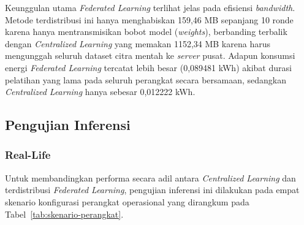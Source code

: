 \documentclass[conference]{IEEEtran}
\begin{document}
Keunggulan utama \textit{Federated Learning} terlihat jelas pada efisiensi \textit{bandwidth}. Metode terdistribusi ini hanya menghabiskan 159,46 MB sepanjang 10 ronde karena hanya mentransmisikan bobot model (\textit{weights}), berbanding terbalik dengan \textit{Centralized Learning} yang memakan 1152,34 MB karena harus mengunggah seluruh dataset citra mentah ke \textit{server} pusat. Adapun konsumsi energi \textit{Federated Learning} tercatat lebih besar (0,089481 kWh) akibat durasi pelatihan yang lama pada seluruh perangkat secara bersamaan, sedangkan \textit{Centralized Learning} hanya sebesar 0,012222 kWh.

\subsection{Pengujian Inferensi}

\subsubsection{Real-Life}
Untuk membandingkan performa secara adil antara \textit{Centralized Learning} dan terdistribusi \textit{Federated Learning}, pengujian inferensi ini dilakukan pada empat skenario konfigurasi perangkat operasional yang dirangkum pada Tabel~\ref{tab:skenario-perangkat}.

{\fontsize{8}{9}\selectfont
\begin{table}[H]
\caption{Skenario Konfigurasi Perangkat Operasional}
\begin{center}
\label{tab:skenario-perangkat}
\end{center}
\end{table}
}
\end{document}
